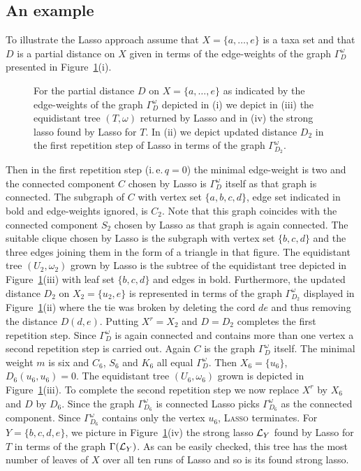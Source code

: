 \subsection{An example}
\label{sec:example}

To illustrate the {\sc Lasso} approach assume that $X=\{a,\ldots, e\}$ is a
taxa set and that $D$ is a partial distance on $X$ given in terms of the
edge-weights of the graph $\Gamma^{\omega}_D$ presented in
Figure~\ref{fig:pink-const}(i).

\begin{figure}
  \centering
  
  \caption{For the partial distance $D$ on $X=\{a,\ldots, e\}$ as indicated by
    the edge-weights of the graph $\Gamma^{\omega}_D$ depicted in (i) we
    depict in (iii) the equidistant tree $(T,\omega)$ returned by {\sc Lasso}
    and in (iv) the strong lasso found by {\sc Lasso} for $T$. In (ii) we
    depict updated distance $D_2$ in the first repetition step of {\sc Lasso}
    in terms of the graph $\Gamma^{\omega}_{D_2}$.}
  \label{fig:pink-const}
\end{figure}
% 
Then in the first repetition step (i.\,e.\,$q=0$) the minimal edge-weight is
two and the connected component $C$ chosen by {\sc Lasso} is
$\Gamma^{\omega}_D$ itself as that graph is connected. The subgraph of $C$
with vertex set $\{a,b,c,d\}$, edge set indicated in bold and edge-weights
ignored, is $C_2$. Note that this graph coincides with the connected component
$S_2$ chosen by {\sc Lasso} as that graph is again connected. The suitable
clique chosen by {\sc Lasso} is the subgraph with vertex set $\{b,c,d\}$ and
the three edges joining them in the form of a triangle in that figure.  The
equidistant tree $(U_2,\omega_2)$ grown by {\sc Lasso} is the subtree of the
equidistant tree depicted in Figure~\ref{fig:pink-const}(iii) with leaf set
$\{b,c,d\}$ and edges in bold. Furthermore, the updated distance $D_2$ on
$X_2=\{u_2,e\}$ is represented in terms of the graph $\Gamma^{\omega}_{D_2}$
displayed in Figure~\ref{fig:pink-const}(ii) where the tie was broken by
deleting the cord $de$ and thus removing the distance $D(d,e)$. Putting
$X^r=X_2$ and $D=D_2$ completes the first repetition step. Since
$\Gamma^{\omega}_D$ is again connected and contains more than one vertex a
second repetition step is carried out. Again $C$ is the graph
$\Gamma^{\omega}_D$ itself.  The minimal weight $m$ is six and $C_6$, $S_6$
and $K_6$ all equal $\Gamma^{\omega}_D$. Then $X_6=\{u_6\}$,
$D_6(u_6,u_6)=0$. The equidistant tree $(U_6,\omega_6)$ grown is depicted in
Figure~\ref{fig:pink-const}(iii). To complete the second repetition step we
now replace $X^r$ by $X_6$ and $D$ by $D_6$. Since the graph
$\Gamma^{\omega}_{D_6}$ is connected {\sc Lasso} picks $\Gamma^{\omega}_{D_6}$
as the connected component. Since $\Gamma^{\omega}_{D_6}$ contains only the
vertex $u_6$, \textsc{Lasso} terminates. For $Y=\{b,c,d,e\}$, we picture in
Figure~\ref{fig:pink-const}(iv) the strong lasso ${\mathcal L}_Y$ found by {\sc Lasso}
for $T$ in terms of the graph $\Gamma({\mathcal L}_Y)$. As can be easily checked, this
tree has the most number of leaves of $X$ over all ten runs of {\sc Lasso} and
so is its found strong lasso.

